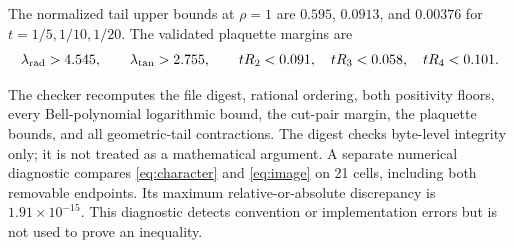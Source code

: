 The normalized tail upper bounds at $\rho=1$ are $0.595$, $0.0913$, and
$0.00376$ for $t=1/5,1/10,1/20$.  The validated plaquette margins are
\[
 \lambda_{\rm rad}>4.545,\qquad
 \lambda_{\rm tan}>2.755,\qquad
 tR_2<0.091,\quad tR_3<0.058,\quad tR_4<0.101.
\]

The checker recomputes the file digest, rational ordering, both positivity
floors, every Bell-polynomial logarithmic bound, the cut-pair margin, the
plaquette bounds, and all geometric-tail contractions.  The digest checks
byte-level integrity only; it is not treated as a mathematical argument.
A separate numerical diagnostic compares \eqref{eq:character} and
\eqref{eq:image} on 21 cells, including both removable endpoints.  Its
maximum relative-or-absolute discrepancy is $1.91\times10^{-15}$.  This
diagnostic detects convention or implementation errors but is not used to
prove an inequality.
